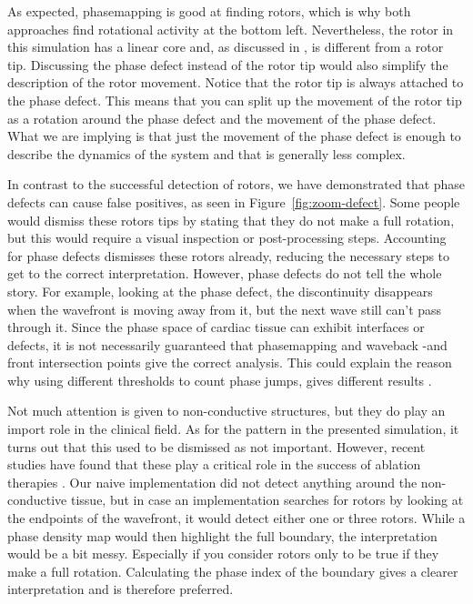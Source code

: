 \documentclass[twocolumn]{article}
\begin{document}
As expected, phasemapping is good at finding rotors, which is why both
approaches find rotational activity at the bottom left. Nevertheless,
the rotor in this simulation has a linear core and, as discussed in
\autocite{arno2021a, tomii2021spatial}, is different from a rotor tip.
Discussing the phase defect instead of the rotor tip would also simplify
the description of the rotor movement. Notice that the rotor tip is
always attached to the phase defect. This means that you can split up
the movement of the rotor tip as a rotation around the phase defect and
the movement of the phase defect. What we are implying is that just the
movement of the phase defect is enough to describe the dynamics of the
system and that is generally less complex.

In contrast to the successful detection of rotors, we have demonstrated
that phase defects can cause false positives, as seen in
Figure~\ref{fig:zoom-defect}. Some people would dismiss these rotors tips
by stating that they do not make a full rotation, but this would require
a visual inspection or post-processing steps. Accounting for phase
defects dismisses these rotors already, reducing the necessary steps to
get to the correct interpretation.
However, phase defects do not tell the whole story. For example, looking
at the phase defect, the discontinuity disappears when the wavefront is
moving away from it, but the next wave still can't pass through it.
Since the phase space of cardiac tissue can exhibit interfaces or
defects, it is not necessarily guaranteed that phasemapping and waveback
-and front intersection points give the correct analysis. This could
explain the reason why using different thresholds to count phase jumps,
gives different results \autocite{li2020standardizing}.

Not much attention is given to non-conductive structures, but they do
play an import role in the clinical field. As for the pattern in the
presented simulation, it turns out that this used to be dismissed as not
important. However, recent studies have found that these play a critical
role in the success of ablation therapies
\autocite{duytschaever2024atrial, santucci2024identification, takigawa2019a}.
Our naive implementation did not detect anything around the
non-conductive tissue, but in case an implementation searches for rotors
by looking at the endpoints of the wavefront, it would detect either one
or three rotors. While a phase density map would then highlight the full
boundary, the interpretation would be a bit messy. Especially if you
consider rotors only to be true if they make a full rotation.
Calculating the phase index of the boundary gives a clearer
interpretation and is therefore preferred.
\end{document}
